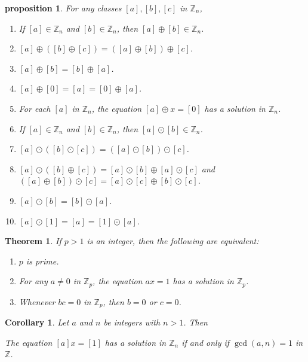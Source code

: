 \documentclass{article}
\newtheorem{theorem}{Theorem}[section]
\newtheorem{corollary}{Corollary}[section]
\newtheorem{proposition}{Proposition}[section]
\newtheorem{proposition}{proposition}[section]
\theoremstyle{definition}
\theoremstyle{remark}
\begin{document}
\begin{proposition}
For any classes $[a], [b], [c]$ in $\mathbb{Z}_n$,

\begin{enumerate}
\item If $[a] \in \mathbb{Z}_n$ and $[b] \in \mathbb{Z}_n$, then $[a] \oplus [b] \in \mathbb{Z}_n$.
\item $[a] \oplus ([b] \oplus [c]) = ([a] \oplus [b]) \oplus [c]$.
\item $[a] \oplus [b] = [b] \oplus [a]$.
\item $[a] \oplus [0] = [a] = [0] \oplus [a]$.
\item For each $[a]$ in $\mathbb{Z}_n$, the equation $[a] \oplus x = [0]$ has a solution in $\mathbb{Z}_n$.
\item If $[a] \in \mathbb{Z}_n$ and $[b] \in \mathbb{Z}_n$, then $[a] \odot [b] \in \mathbb{Z}_n$.
\item $[a] \odot ([b] \odot [c]) = ([a] \odot [b]) \odot [c]$.
\item $[a] \odot ([b] \oplus [c]) = [a] \odot [b] \oplus [a] \odot [c]$ and
\newline \hspace{0.5cm} $([a] \oplus [b]) \odot [c] = [a] \odot [c] \oplus [b] \odot [c]$.
\item $[a] \odot [b] = [b] \odot [a]$.
\item $[a] \odot [1] = [a] = [1] \odot [a]$.
\end{enumerate}
\end{proposition}


\begin{theorem}
If $p > 1$ is an integer, then the following are equivalent:
\begin{enumerate}
\item $p$ is prime.
\item For any $a \neq 0$ in $\mathbb{Z}_p$, the equation $ax = 1$ has a solution in $\mathbb{Z}_p$.
\item Whenever $bc = 0$ in $\mathbb{Z}_p$, then $b = 0$ or $c = 0$.
\end{enumerate}
\end{theorem}






\begin{corollary}
Let $a$ and $n$ be integers with $n > 1$. Then

The equation $[a]x = [1]$ has a solution in $\mathbb{Z}_n$ if and only if $\gcd(a, n) = 1$ in $\mathbb{Z}$.
\end{corollary}
\end{document}
